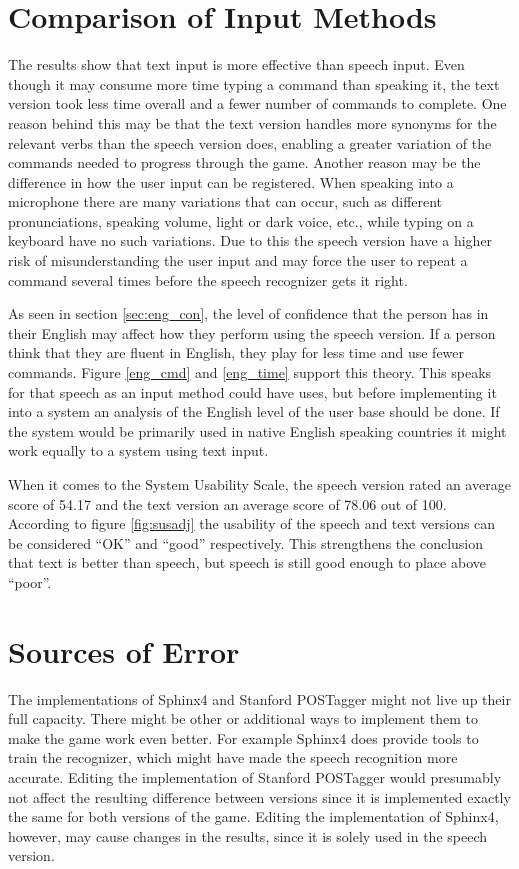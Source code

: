 \section{Comparison of Input Methods} %
The results show that text input is more effective than speech input. Even though it may consume more time typing a command than speaking it, the text version took less time overall and a fewer number of commands to complete. One reason behind this may be that the text version handles more synonyms for the relevant verbs than the speech version does, enabling a greater variation of the commands needed to progress through the game. Another reason may be the difference in how the user input can be registered. When speaking into a microphone there are many variations that can occur, such as different pronunciations, speaking volume, light or dark voice, etc., while typing on a keyboard have no such variations. Due to this the speech version have a higher risk of misunderstanding the user input and may force the user to repeat a command several times before the speech recognizer gets it right. 

As seen in section \ref{sec:eng_con}, the level of confidence that the person has in their English may affect how they perform using the speech version. If a person think that they are fluent in English, they play for less time and use fewer commands. Figure \ref{eng_cmd} and \ref{eng_time} support this theory. This speaks for that speech as an input method could have uses, but before implementing it into a system an analysis of the English level of the user base should be done. If the system would be primarily used in native English speaking countries it might work equally to a system using text input.

When it comes to the System Usability Scale, the speech version rated an average score of 54.17 and the text version an average score of 78.06 out of 100. According to figure \ref{fig:susadj} the usability of the speech and text versions can be considered ``OK'' and ``good'' respectively. This strengthens the conclusion that text is better than speech, but speech is still good enough to place above ``poor''.

\section{Sources of Error} %
The implementations of Sphinx4 and Stanford POSTagger might not live up their full capacity. There might be other or additional ways to implement them to make the game work even better. For example Sphinx4 does provide tools to train the recognizer, which might have made the speech recognition more accurate. Editing the implementation of Stanford POSTagger would presumably not affect the resulting difference between versions since it is implemented exactly the same for both versions of the game. Editing the implementation of Sphinx4, however, may cause changes in the results, since it is solely used in the speech version.

